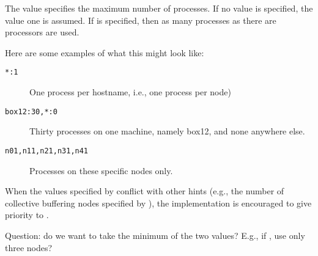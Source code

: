 The value  specifies the maximum number of processes.
If no value is specified, the value one is assumed.  If \code{*} is specified,
then as many processes as there are processors are used.


Here are some examples of what this might look like:

\begin{description}
\item[\texttt{*:1}]One process per hostname, i.e., one process per node)
\item[\texttt{box12:30,*:0}] Thirty processes on one machine, namely box12,
  and none anywhere else.
\item[\texttt{n01,n11,n21,n31,n41}]Processes on these specific nodes only.
\end{description}

When the values specified by  conflict with other hints
(e.g., the number of collective buffering nodes specified by ),
the implementation is encouraged to give priority to .

Question: do we want to take the minimum of the two values?  E.g., if
, use only three nodes?
